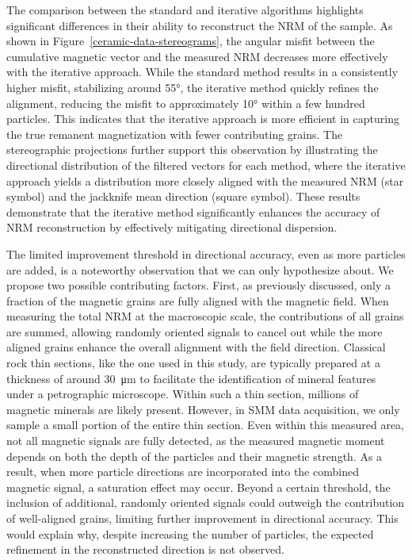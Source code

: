 The comparison between the standard and iterative algorithms highlights significant differences in their ability to reconstruct the NRM of the sample. As shown in Figure~\ref{ceramic-data-stereograms}, the angular misfit between the cumulative magnetic vector and the measured NRM decreases more effectively with the iterative approach. While the standard method results in a consistently higher misfit, stabilizing around \ang{55}, the iterative method quickly refines the alignment, reducing the misfit to approximately \ang{10} within a few hundred particles. This indicates that the iterative approach is more efficient in capturing the true remanent magnetization with fewer contributing grains. The stereographic projections further support this observation by illustrating the directional distribution of the filtered vectors for each method, where the iterative approach yields a distribution more closely aligned with the measured NRM (star symbol) and the jackknife mean direction (square symbol). These results demonstrate that the iterative method significantly enhances the accuracy of NRM reconstruction by effectively mitigating directional dispersion.

The limited improvement threshold in directional accuracy, even as more particles are added, is a noteworthy observation that we can only hypothesize about. We propose two possible contributing factors. First, as previously discussed, only a fraction of the magnetic grains are fully aligned with the magnetic field. When measuring the total NRM at the macroscopic scale, the contributions of all grains are summed, allowing randomly oriented signals to cancel out while the more aligned grains enhance the overall alignment with the field direction. Classical rock thin sections, like the one used in this study, are typically prepared at a thickness of around \qty{30}{\um} to facilitate the identification of mineral features under a petrographic microscope. Within such a thin section, millions of magnetic minerals are likely present. However, in SMM data acquisition, we only sample a small portion of the entire thin section. Even within this measured area, not all magnetic signals are fully detected, as the measured magnetic moment depends on both the depth of the particles and their magnetic strength. As a result, when more particle directions are incorporated into the combined magnetic signal, a saturation effect may occur. Beyond a certain threshold, the inclusion of additional, randomly oriented signals could outweigh the contribution of well-aligned grains, limiting further improvement in directional accuracy. This would explain why, despite increasing the number of particles, the expected refinement in the reconstructed direction is not observed.

